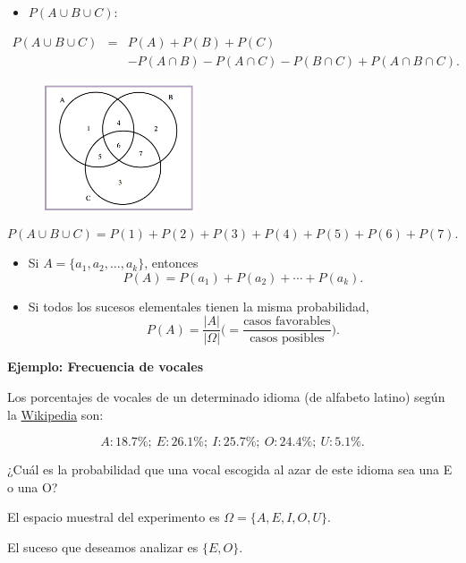 \documentclass[
  letterpaper,
  DIV=11,
  numbers=noendperiod]{scrreprt}
\providecommand{\tightlist}{%
  \setlength{\itemsep}{0pt}\setlength{\parskip}{0pt}}\usepackage{longtable,booktabs,array}
\begin{document}
\begin{itemize}
\tightlist
\item
  \(P(A\cup B\cup C):\)
\end{itemize}

\begin{eqnarray*}
P(A\cup B\cup C)&=&P(A)+P(B)+P(C)  \\ &&-P(A\cap B)-P(A\cap C)-P(B\cap C)  +P(A\cap B\cap C).
\end{eqnarray*}

\begin{figure}

{\centering \includegraphics[width=0.4\textwidth,height=\textheight]{Images/proba1dibujos/tresconjunts.jpg}

}

\end{figure}

\[P(A\cup B\cup C)=P(1)+P(2)+P(3)+P(4)+P(5)+P(6)+P(7).\]

\begin{itemize}
\item
  Si \(A=\{a_1,a_2,\ldots,a_k\}\), entonces \[
  P(A)=P(a_1)+P(a_2)+\cdots+P(a_k).
  \]
\item
  Si todos los sucesos elementales tienen la misma probabilidad, \[
  P(A)=\frac{|A|}{|\Omega|}\Big(=\frac{\mbox{casos favorables}}{\mbox{casos posibles}}\Big).
  \]
\end{itemize}

\textbf{Ejemplo: Frecuencia de vocales}

Los porcentajes de vocales de un determinado idioma (de alfabeto latino)
según la
\href{https://es.wikipedia.org/wiki/Frecuencia_de_aparici\%C3\%B3n_de_letras}{Wikipedia}
son:

\[A: 18.7\%;\ E: 26.1\%;\ I: 25.7\%;\ O: 24.4\%;\  U: 5.1\%.\]

¿Cuál es la probabilidad que una vocal escogida al azar de este idioma
sea una E o una O?

El espacio muestral del experimento es \(\Omega=\{A,E,I,O,U\}\).

El suceso que deseamos analizar es \(\{E,O\}\).
\end{document}
